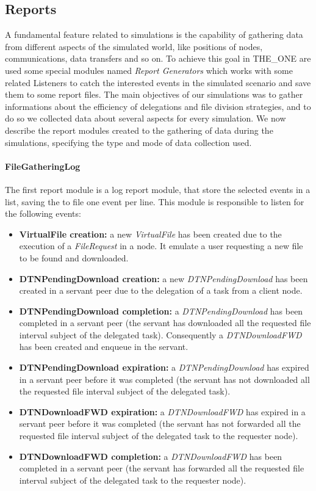 \subsection{Reports}
A fundamental feature related to simulations is the capability of gathering data from different aspects of the simulated world, like positions of nodes, communications, data transfers and so on. To achieve this goal in THE_ONE are used some special modules named \textit{Report Generators} which works with some related Listeners to catch the interested events in the simulated scenario and save them to some report files.
The main objectives of our simulations was to gather informations about the efficiency of delegations and file division strategies, and to do so we collected data about several aspects for every simulation. We now describe the report modules created to the gathering of data during the simulations, specifying the type and mode of data collection used.

\paragraph{FileGatheringLog}
The first report module is a log report module, that store the selected events in a list, saving the to file one event per line. This module is responsible to listen for the following events:
\begin{itemize}
\item \textbf{VirtualFile creation:} a new \textit{VirtualFile} has been created due to the execution of a \textit{FileRequest} in a node. It emulate a user requesting a new file to be found and downloaded.
\item \textbf{DTNPendingDownload creation:} a new \textit{DTNPendingDownload} has been created in a servant peer due to the delegation of a task from a client node.
\item \textbf{DTNPendingDownload completion:} a \textit{DTNPendingDownload} has been completed in a servant peer (the servant has downloaded all the requested file interval subject of the delegated task). Consequently a \textit{DTNDownloadFWD} has been created and enqueue in the servant.
\item \textbf{DTNPendingDownload expiration:} a \textit{DTNPendingDownload} has expired in a servant peer before it was completed (the servant has not downloaded all the requested file interval subject of the delegated task).
\item \textbf{DTNDownloadFWD expiration:} a \textit{DTNDownloadFWD} has expired in a servant peer before it was completed (the servant has not forwarded all the requested file interval subject of the delegated task to the requester node).
\item \textbf{DTNDownloadFWD completion:} a \textit{DTNDownloadFWD} has been completed in a servant peer (the servant has forwarded all the requested file interval subject of the delegated task to the requester node).
\end{itemize}

